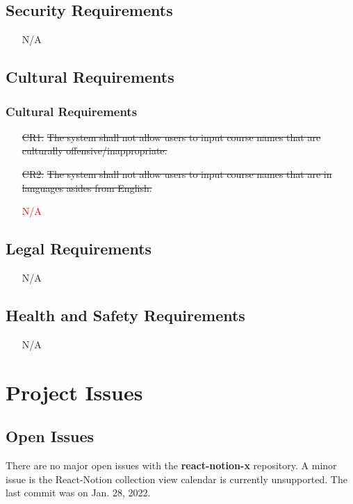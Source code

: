 \documentclass[12pt, titlepage]{article}
\begin{document}
\subsection{Security Requirements}

\begin{itemize}
  \item[] N/A
\end{itemize}

\subsection{Cultural Requirements}

\subsubsection{Cultural Requirements}

\begin{itemize}
  \item[\sout{CR1.}] \sout{The system shall not allow users to input course names that are culturally offensive/inappropriate. }
  \item[\sout{CR2.}] \sout{The system shall not allow users to input course names that are in languages asides from English. }
  \item [] \textcolor{red}{N/A}
\end{itemize}

\subsection{Legal Requirements}

\begin{itemize}
  \item[] N/A
\end{itemize}

\subsection{Health and Safety Requirements}

\begin{itemize}
  \item[] N/A
\end{itemize}

\section{Project Issues}

\subsection{Open Issues}
There are no major open issues with the \textbf{react-notion-x} repository. A minor issue is the React-Notion collection view calendar is currently unsupported. The last commit was on Jan. 28, 2022.
\end{document}
